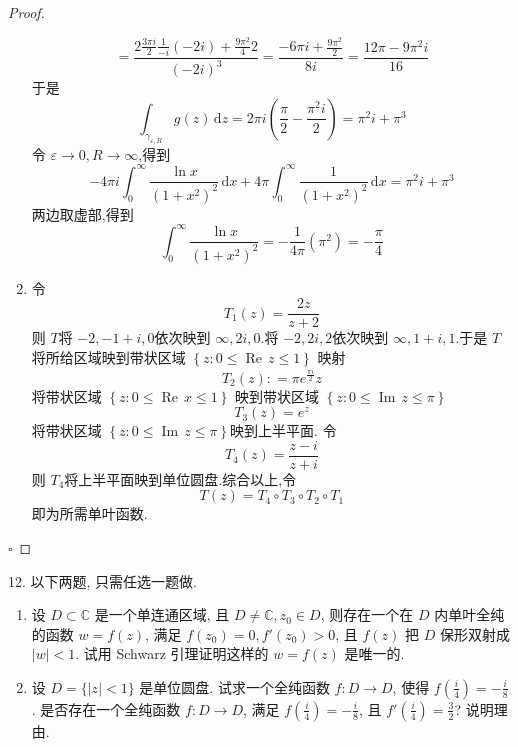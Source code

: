 \documentclass[../../复变函数.tex]{subfiles}
\begin{document}
\begin{proof}
\begin{enumerate}
\[    \]\[
    = \frac{2\frac{3\pi i }{2 }\frac{1 }{-i }\left( -2i \right)+ \frac{9\pi ^{2} }{4 }2     }{ \left( -2i \right)^{3} }= \frac{-6\pi i+ \frac{9\pi ^{2} }{2 }  }{8i }= \frac{ 12\pi -9\pi^{2} i}{16 }   
    \]于是 \[
    \int_{ \gamma _{ \varepsilon ,R}}g\left( z \right)\,\mathrm{d} z= 2\pi i\left( \frac{\pi  }{2 }-\frac{\pi ^{2}i }{2 }   \right)= \pi ^{2}i+ \pi ^{3} 
    \]令 \(   \varepsilon \to 0,R\to \infty  \),得到 \[
    -4\pi i \int_{0}^{\infty}\frac{\ln x }{\left( 1+ x^{2} \right)^{2}  } \,\mathrm{d} x+ 4\pi \int_{0}^{\infty}\frac{1 }{\left( 1+ x^{2} \right)^{2}  }\,\mathrm{d} x=\pi ^{2}i+ \pi ^{3} 
    \] 两边取虚部,得到 \[
    \int_{0}^{\infty}\frac{\ln x }{\left( 1+ x^{2} \right)^{2}  }= -\frac{1 }{4\pi  } \left( \pi ^{2} \right)=-\frac{\pi  }{4 } 
    \]
    \item 令 \[
    T_1\left( z \right)= \frac{2z }{z+ 2 }  
    \]则 \(  T  \)将 \(  -2,-1+ i,0  \)依次映到 \(  \infty,2i,0  \).将 \(  -2,2i,2  \)依次映到 \(  \infty,1+ i,1  \).于是 \(  T  \)将所给区域映到带状区域 \(  \left\{ z: 0\le \operatorname{Re}\,z\le 1 \right\}  \)  映射\[
    T_2\left( z \right): = \pi e^{\frac{\pi i  }{2 }}z 
    \]将带状区域 \(  \left\{ z: 0\le \operatorname{Re}\,x\le 1 \right\}  \) 映到带状区域 \(  \left\{ z:0\le \operatorname{Im}\,z\le \pi  \right\}  \) 
    \[
    T_3\left( z \right)= e^{z} 
    \]将带状区域 \(  \left\{ z:0\le \operatorname{Im}\,z\le \pi  \right\}  \)映到上半平面. 令 \[
    T_4\left( z \right)= \frac{z-i }{z+ i }  
    \]则 \(  T_4  \)将上半平面映到单位圆盘.综合以上,令  \[
    T\left( z \right) = T_4\circ T_3\circ T_2\circ T_1
    \]即为所需单叶函数.
    \end{enumerate}
    

    \hfill $\square$
\end{proof}
\begin{problem}
12. 以下两题, 只需任选一题做.
\begin{enumerate}
    \item 设 $D \subset \mathbb{C}$ 是一个单连通区域, 且 $D \ne \mathbb{C}, z_0 \in D$, 则存在一个在 $D$ 内单叶全纯的函数 $w=f(z)$, 满足 $f(z_0)=0, f'(z_0)>0$, 且 $f(z)$ 把 $D$ 保形双射成 $|w|<1$. 试用 Schwarz 引理证明这样的 $w=f(z)$ 是唯一的.
    \item 设 $D = \{|z|<1\}$ 是单位圆盘. 试求一个全纯函数 $f: D \to D$, 使得 $f\left(\frac{i}{4}\right) = -\frac{i}{8}$. 是否存在一个全纯函数 $f: D \to D$, 满足 $f\left(\frac{i}{4}\right) = -\frac{i}{8}$, 且 $f'\left(\frac{i}{4}\right) = \frac{3}{2}$? 说明理由.
\end{enumerate}
\end{problem}
\end{document}
